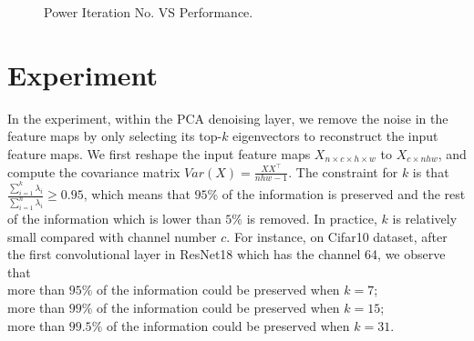 \documentclass{article}
\begin{document}
\begin{figure}[!htb]
\begin{floatrow}
{%
  \caption{Power Iteration No. VS Performance.}%
}
\end{floatrow}
\end{figure}

\section{Experiment}

In the experiment, within the PCA denoising layer, we remove the noise in the feature maps by only selecting its top-$k$ eigenvectors to reconstruct the input feature maps.
We first reshape the input feature maps $X_{n {\times} c {\times} h {\times} w}$ to $X_{c {\times} nhw}$, and compute the covariance matrix $Var(X) =\frac{XX^{\top}}{nhw-1}$.
The constraint for $k$ is that $\frac{\sum_{i=1}^k\lambda_i}{\sum_{i=1}^n\lambda_i} \geq 0.95$, which means that $95\%$ of the information is preserved and the rest of the information which is lower than $5\%$ is removed. 
In practice, $k$ is relatively small compared with channel number $c$. For instance, on Cifar10 dataset, after the first convolutional layer in ResNet18 which has the channel 64, we observe that \\
more than $95\%$ of the information could be preserved when $k=7$; \\
more than $99\%$ of the information could be preserved when $k=15$; \\
more than $99.5\%$ of the information could be preserved when $k=31$. 
\end{document}

